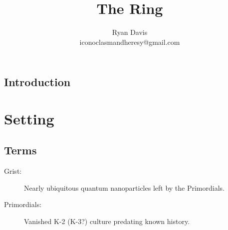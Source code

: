 \documentclass[letterpaper, 12pt]{report}
\title{The Ring}
\author{Ryan Davis\\iconoclasmandheresy@gmail.com}
\begin{document}
\tableofcontents
\section{Introduction}
\chapter{Setting}
\section{Terms}
\begin{description}
\item[Grist:] Nearly ubiquitous quantum nanoparticles left by the Primordials.
\item[Primordials:] Vanished K-2 (K-3?) culture predating known history.
\end{description}
\end{document}
